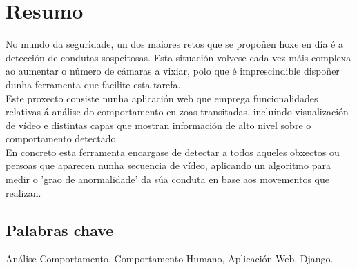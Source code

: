 \chapter*{Resumo}

No mundo da seguridade, un dos maiores retos que se propoñen hoxe en día é a detección de
condutas sospeitosas. Esta situación volvese cada vez máis complexa ao aumentar o número de
cámaras a vixiar, polo que é imprescindible dispoñer dunha ferramenta que facilite esta
tarefa.\\

Este proxecto consiste nunha aplicación web que emprega funcionalidades relativas á análise do
comportamento en zoas transitadas, incluíndo visualización de vídeo e distintas capas que
mostran información de alto nivel sobre o comportamento detectado.\\

En concreto esta ferramenta encargase de detectar a todos aqueles obxectos ou persoas que 
aparecen nunha secuencia de vídeo, aplicando un algoritmo para medir o 'grao de anormalidade'
da súa conduta en base aos movementos que realizan.\\

\section*{Palabras chave}

Análise Comportamento, Comportamento Humano, Aplicación Web, Django.
